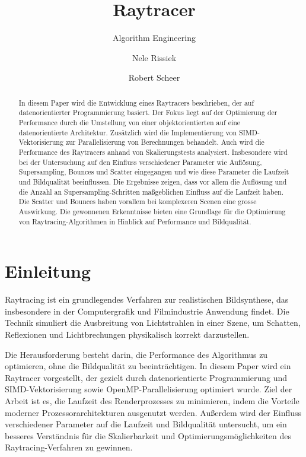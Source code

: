 \documentclass[sigconf]{acmart}
\begin{document}
\thispagestyle{fancy}

\title{Raytracer}
\subtitle{Algorithm Engineering}         %

\author{Nele Rissiek}
\author{Robert Scheer}

\begin{abstract}
In diesem Paper wird die Entwicklung eines Raytracers beschrieben, der auf datenorientierter Programmierung basiert.
Der Fokus liegt auf der Optimierung der Performance durch die Umstellung von einer objektorientierten auf eine datenorientierte Architektur.
Zusätzlich wird die Implementierung von SIMD-Vektorisierung zur Parallelisierung von Berechnungen behandelt.
Auch wird die Performance des Raytracers anhand von Skalierungstests analysiert.
Insbesondere wird bei der Untersuchung auf den Einfluss verschiedener Parameter wie Auflösung, Supersampling, Bounces und Scatter eingegangen und wie diese Parameter die Laufzeit und Bildqualität beeinflussen.
Die Ergebnisse zeigen, dass vor allem die Auflösung und die Anzahl an Supersampling-Schritten maßgeblichen Einfluss auf die Laufzeit haben. Die Scatter und Bounces haben vorallem bei komplexeren Scenen eine grosse Auswirkung.
Die gewonnenen Erkenntnisse bieten eine Grundlage für die Optimierung von Raytracing-Algorithmen in Hinblick auf Performance und Bildqualität.
 \end{abstract}

\maketitle
\section{Einleitung} \label{Einleitung}
Raytracing ist ein grundlegendes Verfahren zur realistischen Bildsynthese, das insbesondere in der Computergrafik und Filmindustrie Anwendung findet.
Die Technik simuliert die Ausbreitung von Lichtstrahlen in einer Szene, um Schatten, Reflexionen und Lichtbrechungen physikalisch korrekt darzustellen.

Die Herausforderung besteht darin, die Performance des Algorithmus zu optimieren, ohne die Bildqualität zu beeinträchtigen.
In diesem Paper wird ein Raytracer vorgestellt, der gezielt durch datenorientierte Programmierung und SIMD-Vektorisierung sowie OpenMP-Parallelisierung optimiert wurde.
Ziel der Arbeit ist es, die Laufzeit des Renderprozesses zu minimieren, indem die Vorteile moderner Prozessorarchitekturen ausgenutzt werden.
Außerdem wird der Einfluss verschiedener Parameter auf die Laufzeit und Bildqualität untersucht, um ein besseres Verständnis für die Skalierbarkeit und Optimierungsmöglichkeiten des Raytracing-Verfahren zu gewinnen.
\end{document}
